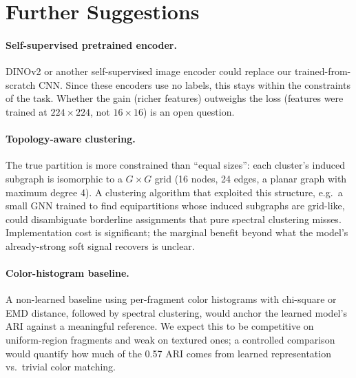 \documentclass[12pt, a4paper]{article}
\begin{document}
\section{Further Suggestions}

\paragraph{Self-supervised pretrained encoder.}
DINOv2 \parencite{moco2020} or another self-supervised image encoder could replace our
trained-from-scratch CNN. Since these encoders use no labels, this stays within the
constraints of the task. Whether the gain (richer features) outweighs the loss
(features were trained at $224 \times 224$, not $16 \times 16$) is an open question.

\paragraph{Topology-aware clustering.}
The true partition is more constrained than ``equal sizes'': each cluster's induced
subgraph is isomorphic to a $G \times G$ grid (16 nodes, 24 edges, a planar graph with
maximum degree 4). A clustering algorithm that exploited this structure, e.g.\ a small
GNN trained to find equipartitions whose induced subgraphs are grid-like, could
disambiguate borderline assignments that pure spectral clustering misses. Implementation
cost is significant; the marginal benefit beyond what the model's already-strong soft
signal recovers is unclear.

\paragraph{Color-histogram baseline.}
A non-learned baseline using per-fragment color histograms with chi-square or EMD
distance, followed by spectral clustering, would anchor the learned model's ARI against
a meaningful reference. We expect this to be competitive on uniform-region fragments
and weak on textured ones; a controlled comparison would quantify how much of the 0.57
ARI comes from learned representation vs.\ trivial color matching.

\printbibliography
\end{document}
